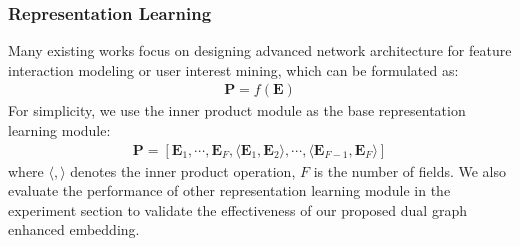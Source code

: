 \subsubsection{Representation Learning}
Many existing works focus on designing advanced network architecture for feature interaction modeling or user interest mining, which can be formulated as:
\begin{align}
\textbf{P} = f(\textbf{E})
\end{align}
For simplicity, we use the inner product module as the base representation learning module:
\begin{align}
\textbf{P} = [\textbf{E}_1, \cdots, \textbf{E}_F, \langle\textbf{E}_1,\textbf{E}_2\rangle,\cdots, \langle\textbf{E}_{F-1},\textbf{E}_{F}\rangle]
\end{align}
where $\langle,\rangle$ denotes the inner product operation, $F$ is the number of fields.
We also evaluate the performance of other representation learning module in the experiment section to validate the effectiveness of our proposed dual graph enhanced embedding.

